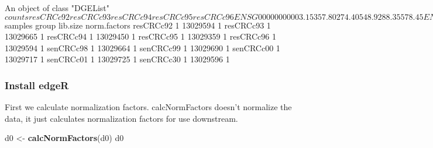 \documentclass[
]{article}
\newenvironment{Shaded}{\begin{snugshade}}{\end{snugshade}}
\newcommand{\FunctionTok}[1]{\textcolor[rgb]{0.13,0.29,0.53}{\textbf{#1}}}
\newcommand{\NormalTok}[1]{#1}
\newcommand{\OtherTok}[1]{\textcolor[rgb]{0.56,0.35,0.01}{#1}}
\begin{document}
\begin{Shaded}
\begin{Highlighting}[]
\NormalTok{An object of class "DGEList"}
\NormalTok{$counts}
\NormalTok{                   resCRCc92 resCRCc93 resCRCc94 resCRCc95 resCRCc96}
\NormalTok{ENSG00000000003.15    357.80    274.40     548.9    288.35    578.45}
\NormalTok{ENSG00000000419.14    530.60    499.75     509.0    372.85    361.90}
\NormalTok{ENSG00000000457.14    224.80    219.90     123.2     78.00    152.30}
\NormalTok{ENSG00000000460.17    264.40    101.80     215.3    312.20    197.20}
\NormalTok{ENSG00000001036.14    640.65    588.80     929.9    869.95    891.40}
\NormalTok{                   senCRCc98 senCRCc99 senCRCc00 senCRCc01 senCRCc30}
\NormalTok{ENSG00000000003.15    638.75     781.5     304.5     378.2     517.8}
\NormalTok{ENSG00000000419.14   1168.40    1009.1     640.7     714.8     475.5}
\NormalTok{ENSG00000000457.14    105.00     118.3      98.4     144.6     675.5}
\NormalTok{ENSG00000000460.17    221.90     170.3     107.7     121.0     183.4}
\NormalTok{ENSG00000001036.14    468.50     275.7     600.4    1102.4    1424.8}
\NormalTok{16944 more rows ...}

\NormalTok{$samples}
\NormalTok{         group lib.size norm.factors}
\NormalTok{resCRCc92     1 13029594            1}
\NormalTok{resCRCc93     1 13029665            1}
\NormalTok{resCRCc94     1 13029450            1}
\NormalTok{resCRCc95     1 13029359            1}
\NormalTok{resCRCc96     1 13029594            1}
\NormalTok{senCRCc98     1 13029664            1}
\NormalTok{senCRCc99     1 13029690            1}
\NormalTok{senCRCc00     1 13029717            1}
\NormalTok{senCRCc01     1 13029725            1}
\NormalTok{senCRCc30     1 13029596            1}
\end{Highlighting}
\end{Shaded}

\subsubsection{Install edgeR}\label{install-edger}

First we calculate normalization factors. calcNormFactors doesn't
normalize the data, it just calculates normalization factors for use
downstream.

\begin{Shaded}
\begin{Highlighting}[]
\NormalTok{d0 }\OtherTok{\textless{}{-}} \FunctionTok{calcNormFactors}\NormalTok{(d0)}
\NormalTok{d0}
\end{Highlighting}
\end{Shaded}
\end{document}
